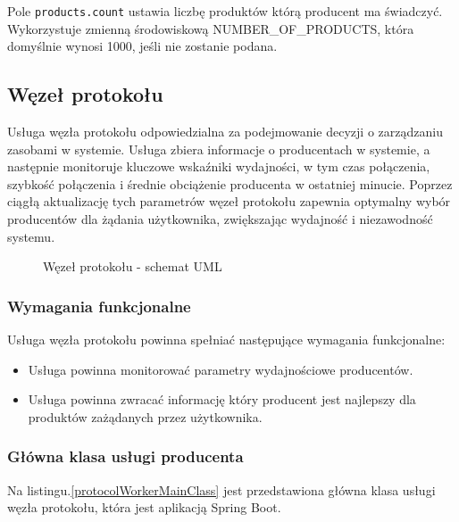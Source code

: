 Pole \verb|products.count| ustawia liczbę produktów którą producent ma świadczyć. Wykorzystuje zmienną środowiskową NUMBER\_OF\_PRODUCTS, która domyślnie wynosi 1000, jeśli nie zostanie podana.

\subsection{Węzeł protokołu}

Usługa węzła protokołu odpowiedzialna za podejmowanie decyzji o zarządzaniu zasobami w systemie. Usługa zbiera informacje o producentach w systemie, a następnie monitoruje kluczowe wskaźniki wydajności, w tym czas połączenia, szybkość połączenia i średnie obciążenie producenta w ostatniej minucie. Poprzez ciągłą aktualizację tych parametrów węzeł protokołu zapewnia optymalny wybór producentów dla żądania użytkownika, zwiększając wydajność i niezawodność systemu.

\begin{figure}[!htbp]
    \centering
    
    \caption{Węzeł protokołu - schemat UML}
    \label{WorkerUML}
\end{figure}

\subsubsection{Wymagania funkcjonalne}

Usługa węzła protokołu powinna spełniać następujące wymagania funkcjonalne:

\begin{itemize}
    \item Usługa powinna monitorować parametry wydajnościowe producentów.
    \item Usługa powinna zwracać informację który producent jest najlepszy dla produktów zażądanych przez użytkownika.
\end{itemize}

\subsubsection{Główna klasa usługi producenta}

Na listingu.\ref{protocolWorkerMainClass} jest przedstawiona główna klasa usługi węzła protokołu, która jest aplikacją Spring Boot.

